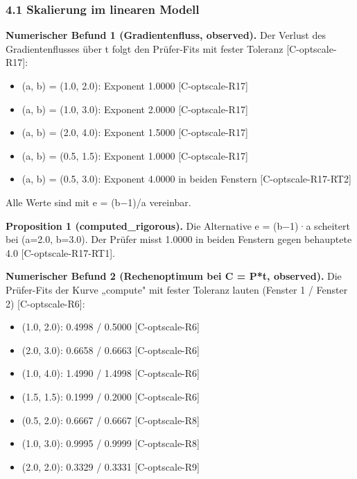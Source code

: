 \documentclass[10pt,twocolumn]{article}
\begin{document}
\subsubsection*{4.1 Skalierung im linearen Modell}

\textbf{Numerischer Befund 1 (Gradientenfluss, observed).} Der Verlust des Gradientenflusses über t folgt den Prüfer-Fits mit fester Toleranz {\scriptsize[C-optscale-R17]}:

\begin{itemize}
\item (a, b) = (1.0, 2.0): Exponent 1.0000 {\scriptsize[C-optscale-R17]}
\item (a, b) = (1.0, 3.0): Exponent 2.0000 {\scriptsize[C-optscale-R17]}
\item (a, b) = (2.0, 4.0): Exponent 1.5000 {\scriptsize[C-optscale-R17]}
\item (a, b) = (0.5, 1.5): Exponent 1.0000 {\scriptsize[C-optscale-R17]}
\item (a, b) = (0.5, 3.0): Exponent 4.0000 in beiden Fenstern {\scriptsize[C-optscale-R17-RT2]}
\end{itemize}

Alle Werte sind mit e = (b−1)/a vereinbar.

\textbf{Proposition 1 (computed_rigorous).} Die Alternative e = (b−1)·a scheitert bei (a=2.0, b=3.0). Der Prüfer misst 1.0000 in beiden Fenstern gegen behauptete 4.0 {\scriptsize[C-optscale-R17-RT1]}.

\textbf{Numerischer Befund 2 (Rechenoptimum bei C = P*t, observed).} Die Prüfer-Fits der Kurve „compute" mit fester Toleranz lauten (Fenster 1 / Fenster 2) {\scriptsize[C-optscale-R6]}:

\begin{itemize}
\item (1.0, 2.0): 0.4998 / 0.5000 {\scriptsize[C-optscale-R6]}
\item (2.0, 3.0): 0.6658 / 0.6663 {\scriptsize[C-optscale-R6]}
\item (1.0, 4.0): 1.4990 / 1.4998 {\scriptsize[C-optscale-R6]}
\item (1.5, 1.5): 0.1999 / 0.2000 {\scriptsize[C-optscale-R6]}
\item (0.5, 2.0): 0.6667 / 0.6667 {\scriptsize[C-optscale-R8]}
\item (1.0, 3.0): 0.9995 / 0.9999 {\scriptsize[C-optscale-R8]}
\item (2.0, 2.0): 0.3329 / 0.3331 {\scriptsize[C-optscale-R9]}
\end{itemize}
\end{document}
